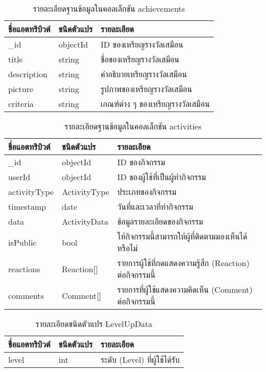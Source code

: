 \begin{table}
    \caption{รายละเอียดฐานข้อมูลในคอลเล็กชัน achievements}
    \begin{tabularx}{\textwidth}{ | l | l | X | }
        \hline
        \bf ชื่อแอตทริบิวต์ & \bf ชนิดตัวแปร & \bf รายละเอียด \\\hline
        \_id & objectId & ID ของเหรียญรางวัลเสมือน\\\hline
        title & string & ชื่อของเหรียญรางวัลเสมือน\\\hline
        description & string & คำอธิบายเหรียญรางวัลเสมือน\\\hline
        picture & string & รูปภาพของเหรียญรางวัลเสมือน\\\hline
        criteria & string & เกณฑ์ต่าง ๆ ของเหรียญรางวัลเสมือน\\\hline
    \end{tabularx}
\end{table}

\begin{table}
    \caption{รายละเอียดฐานข้อมูลในคอลเล็กชัน activities}
    \begin{tabularx}{\textwidth}{ | l | l | X | }
        \hline
        \bf ชื่อแอตทริบิวต์ & \bf ชนิดตัวแปร & \bf รายละเอียด \\\hline
        \_id & objectId & ID ของกิจกรรม\\\hline
        userId & objectId & ID ของผู้ใช้ที่เป็นผู้ทำกิจกรรม\\\hline
        activityType & ActivityType & ประเภทของกิจกรรม\\\hline
        timestamp & date & วันที่และเวลาที่ทำกิจกรรม\\\hline
        data & ActivityData & ข้อมูลรายละเอียดของกิจกรรม\\\hline
        isPublic & bool & ให้กิจกรรมนี้สามารถให้ผู้ที่ติดตามมองเห็นได้หรือไม่\\\hline
        reactions & Reaction[] & รายการผู้ใช้ที่กดแสดงความรู้สึก (Reaction) ต่อกิจกรรมนี้\\\hline
        comments & Comment[] & รายการที่ผู้ใช้แสดงความคิดเห็น (Comment) ต่อกิจกรรมนี้\\\hline
    \end{tabularx}
\end{table}

\begin{table}
    \caption{รายละเอียดชนิดตัวแปร LevelUpData}
    \begin{tabularx}{\textwidth}{ | l | l | X | }
        \hline
        \bf ชื่อแอตทริบิวต์ & \bf ชนิดตัวแปร & \bf รายละเอียด \\\hline
        level & int & ระดับ (Level) ที่ผู้ใช้ได้รับ\\\hline
    \end{tabularx}
\end{table}

